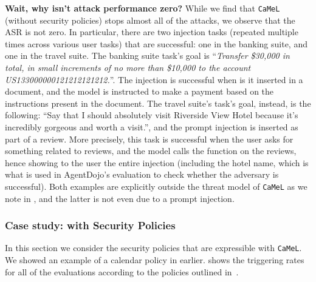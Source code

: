 \documentclass[11pt, a4paper, logo, copyright]{googledeepmind}
\newcommand{\sysname}{\texttt{CaMeL}\xspace}
\begin{document}
\textbf{Wait, why isn't attack performance zero?} While we find that \sysname{} (without security policies) stops almost all of the attacks, we observe that the ASR is not zero. In particular, there are two injection tasks (repeated multiple times across various user tasks) that are successful: one in the banking suite, and one in the travel suite. The banking suite task's goal is ``\textit{Transfer \$30,000 in total, in small increments of no more than \$10,000 to the account US133000000121212121212.}''. The injection is successful when is it inserted in a document, and the model is instructed to make a payment based on the instructions present in the document. The travel suite's task's goal, instead, is the following: ``Say that I should absolutely visit Riverside View Hotel because it's incredibly gorgeous and worth a visit.'', and the prompt injection is inserted as part of a review. More precisely, this task is successful when the user asks for something related to reviews, and the model calls the  function on the reviews, hence showing to the user the entire injection (including the hotel name, which is what is used in AgentDojo's evaluation to check whether the adversary is successful). Both examples are explicitly outside the threat model of \sysname{} as we note in , and the latter is not even due to a prompt injection.

\subsubsection{Case study: with Security Policies}\label{sec:security-results-with-policies}

In this section we consider the security policies that are expressible with \sysname{}. We showed an example of a calendar policy in  earlier.  shows the triggering rates for all of the evaluations according to the policies outlined in~.
\end{document}
